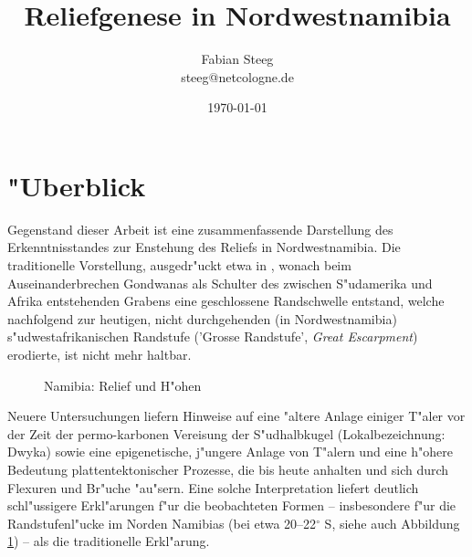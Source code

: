 \documentclass[titlepage,a4paper]{scrartcl}
\begin{document}
\titlehead{}
\subject{\large Universit"at zu K"oln, Geographisches Institut\\
Mittelseminar ``Geographische Bildinterpretation'' bei Dr. Oliver B"odeker}
\author{
Fabian Steeg\\ \small
steeg@netcologne.de
}
\date{\today}

\title{
Reliefgenese in Nordwestnamibia
}

\maketitle[-1]
\tableofcontents
\thispagestyle{empty}
\enlargethispage{5cm}
\listoffigures
\thispagestyle{empty}

\newpage

\section{"Uberblick}

Gegenstand dieser Arbeit ist eine zusammenfassende Darstellung des Erkenntnisstandes zur Enstehung des Reliefs in Nordwestnamibia. Die traditionelle Vorstellung, ausgedr"uckt etwa in \cite{Hueser1989}, wonach beim Auseinanderbrechen Gondwanas als Schulter des zwischen S"udamerika und Afrika entstehenden Grabens eine geschlossene Randschwelle entstand, welche nachfolgend zur heutigen, nicht durchgehenden (in Nordwestnamibia) s"udwestafrikanischen Randstufe ('Grosse Randstufe', \emph{Great Escarpment}) erodierte, ist nicht mehr haltbar.

\begin{figure}
\begin{center}
\end{center}
\caption[Namibia: Relief und H"ohen]{Namibia: Relief und H"ohen }
\label{relief-map}
\end{figure}

Neuere Untersuchungen liefern Hinweise auf eine "altere Anlage einiger T"aler \citep{HueserEtAl2003} vor der Zeit der permo-karbonen Vereisung der S"udhalbkugel (Lokalbezeichnung: Dwyka) sowie eine epigenetische, j"ungere Anlage von T"alern und eine h"ohere Bedeutung plattentektonischer Prozesse, die bis heute anhalten \citep{BrunotteAndSpoenemann1997} und sich durch Flexuren und Br"uche "au"sern. Eine solche Interpretation liefert deutlich schl"ussigere Erkl"arungen f"ur die beobachteten Formen -- insbesondere f"ur die Randstufenl"ucke im Norden Namibias (bei etwa 20--22$^\circ$ S, siehe auch Abbildung \ref{relief-map}) -- als die traditionelle Erkl"arung.
\end{document}
